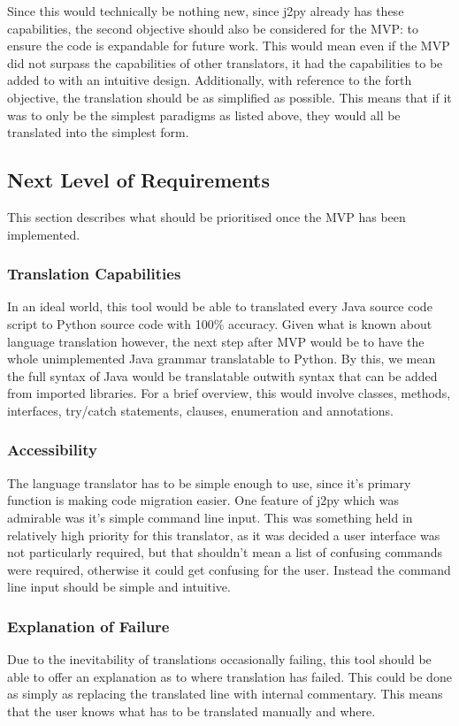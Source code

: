 \documentclass{l4proj}
\begin{document}
Since this would technically be nothing new, since j2py already has these capabilities, the second objective should also be considered for the MVP: to ensure the code is expandable for future work. This would mean even if the MVP did not surpass the capabilities of other translators, it had the capabilities to be added to with an intuitive design. Additionally, with reference to the forth objective, the translation should be as simplified as possible. This means that if it was to only be the simplest paradigms as listed above, they would all be translated into the simplest form.

\subsection{Next Level of Requirements}
This section describes what should be prioritised once the MVP has been implemented.

\subsubsection{Translation Capabilities} In an ideal world, this tool would be able to translated every Java source code script to Python source code with 100\% accuracy. Given what is known about language translation however, the next step after MVP would be to have the whole unimplemented Java grammar translatable to Python. By this, we mean the full syntax of Java would be translatable outwith syntax that can be added from imported libraries. For a brief overview, this would involve classes, methods, interfaces, try/catch statements, clauses, enumeration and annotations.

\subsubsection{Accessibility}
The language translator has to be simple enough to use, since it's primary function is making code migration easier. One feature of j2py which was admirable was it's simple command line input. This was something held in relatively high priority for this translator, as it was decided a user interface was not particularly required, but that shouldn't mean a list of confusing commands were required, otherwise it could get confusing for the user. Instead the command line input should be simple and intuitive.

\subsubsection{Explanation of Failure}
Due to the inevitability of translations occasionally failing, this tool should be able to offer an explanation as to where translation has failed. This could be done as simply as replacing the translated line with internal commentary. This means that the user knows what has to be translated manually and where.
\end{document}
